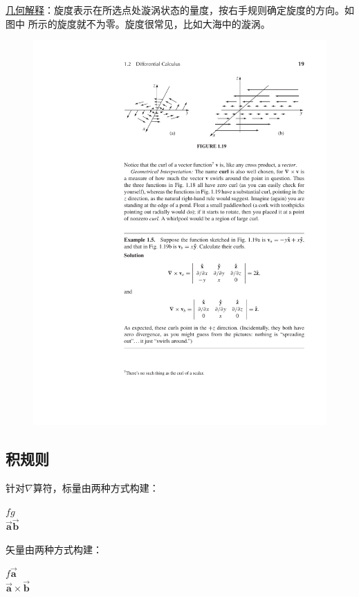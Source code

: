 \uline{几何解释}：旋度表示在所选点处漩涡状态的量度，按右手规则确定旋度的方向。如图中
所示的旋度就不为零。旋度很常见，比如大海中的漩涡。
\begin{figure}[ht]
    \centering
    \setlength{\abovecaptionskip}{0.2cm}
    \includegraphics[scale=1.3]{./figure/math/vec-curl.pdf}
    \caption{}
    \label{fig:vec-curl}
\end{figure}

\subsection{积规则}
针对$\nabla$算符，标量由两种方式构建：
\begin{center}
    $fg$ \\
    $\vec{\bm{a}}\vec{\bm{b}}$
\end{center}
矢量由两种方式构建：
\begin{center}
    $f\vec{\bm{a}}$ \\
    $\vec{\bm{a}} \times \vec{\bm{b}}$
\end{center}

